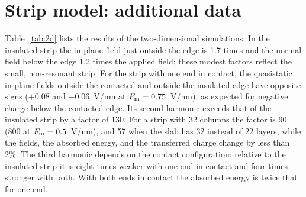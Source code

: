 \documentclass[aps,prl,onecolumn,superscriptaddress,notitlepage]{revtex4-2}
\begin{document}
\begin{table}[h]
\caption{Convergence tests and additional runs of the chain model at $D_0=5.5$~V/nm. Note that $F$ is
evaluated in a fixed window, so that the insulated peak field at given $D_0$ depends on $\ell$.}
\label{tab:extra}

\end{table}

\section{Strip model: additional data}
\label{sec:2d}
Table~\ref{tab:2d} lists the results of the two-dimensional simulations. In the insulated strip
the in-plane field just outside the edge is 1.7 times and the normal field below the edge 1.2 times
the applied field; these modest factors reflect the small, non-resonant strip. For the strip with
one end in contact, the quasistatic in-plane fields outside the contacted and outside the
insulated edge have opposite signs ($+0.08$ and $-0.06$~V/nm at $F_{\rm m}=0.75$~V/nm), as expected
for negative charge below the contacted edge. Its second harmonic exceeds that of the
insulated strip by a factor of 130. For a strip with 32 columns the factor is 90 (800 at
$F_{\rm m}=0.5$~V/nm), and 57 when the slab has 32 instead of 22 layers, while the fields, the
absorbed energy, and the transferred charge change by less than 2\%. The third harmonic depends on
the contact configuration: relative to the insulated strip it is eight times weaker with one end in
contact and four times stronger with both. With both ends in contact the absorbed energy is twice
that for one end.

\begin{table}[h]
\caption{Strip model. $|F_x|^{\rm out}$: peak in-plane field outside the right edge; $F_{z,\pm}$ and
$F_{z,{\rm dc}}$: extrema and mean over the two central cycles of the normal field below the right
edge; $W$: absorbed energy per period and per unit length of the strip; $S_n$: yields of the in-plane
emission, normalized to the linear yield $S_1$ of the insulated strip (of the strip with one end in
contact where no insulated run exists). Unless noted the slab has 22 layers and the pulse five
cycles. ``Wedge'': the right end of the strip is beveled at 45$^\circ$ with its tip on the
crystal.}
\label{tab:2d}
\footnotesize\setlength{\tabcolsep}{3.5pt}

\end{table}
\end{document}
